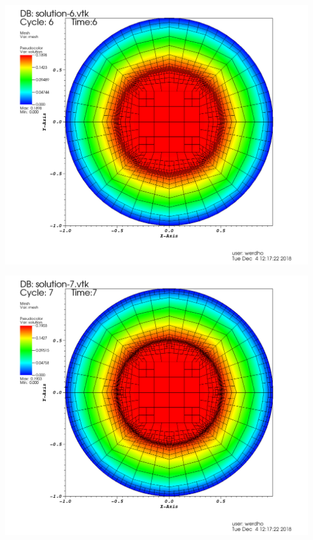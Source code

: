 \documentclass[9pt]{beamer}
\begin{document}
\begin{frame}
\begin{minipage}{.45\paperwidth}
	\includegraphics[scale=.12]{solu-4-7.png}
\end{minipage}%
\begin{minipage}{.4\paperwidth}
	\centering
	\includegraphics[scale=.12]{solu-4-8.png}
\end{minipage}
\end{frame}
\end{document}
